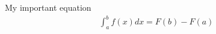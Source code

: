 \documentclass{article}
\begin{document}
My important equation
\begin{eqnarray}
\int_{a}^{b} f(x)dx = F(b) - F(a)
\end{eqnarray}
\end{document}
